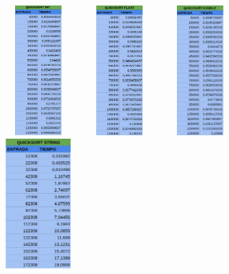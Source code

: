 \documentclass[11pt]{article}
\begin{document}
\begin{figure}[H]
    \begin{minipage}{0.5\textwidth}
        \centering
        \includegraphics[width=3cm, height=5cm]{assets/Img/quicksorttabla1.png}

    \end{minipage}%
    \begin{minipage}{0.5\textwidth}
        \centering
        \includegraphics[width=3cm, height=5cm]{assets/Img/quicksorttabla2.png}

    \end{minipage}
    \begin{minipage}{0.5\textwidth}
        \centering
        \includegraphics[width=3cm, height=5cm]{assets/Img/quicksorttabla3.png}

    \end{minipage}
    \begin{minipage}{0.5\textwidth}
        \centering
        \includegraphics[width=3cm, height=5cm]{assets/Img/quicksorttabla4.png}
    \end{minipage}
\end{figure}
\end{document}
